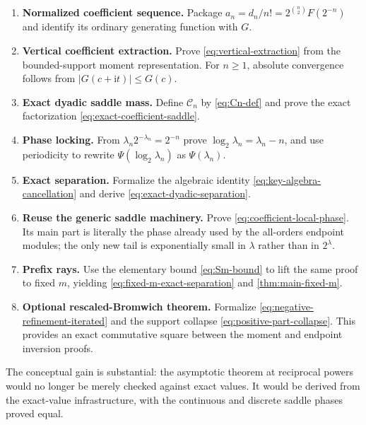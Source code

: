\documentclass[11pt,oneside]{article}
\theoremstyle{definition}
\theoremstyle{remark}
\newcommand{\ii}{\mathrm i}
\newcommand{\CoeffMass}{\mathcal C}
\begin{document}
\begin{enumerate}
\item \textbf{Normalized coefficient sequence.}  Package
$a_n=d_n/n!=2^{\binom n2}F(2^{-n})$ and identify its ordinary generating function with $G$.

\item \textbf{Vertical coefficient extraction.}  Prove
\eqref{eq:vertical-extraction} from the bounded-support moment representation.  For $n\ge1$, absolute convergence follows from
$|G(c+\ii t)|\le G(c)$.

\item \textbf{Exact dyadic saddle mass.}  Define $\CoeffMass_n$ by
\eqref{eq:Cn-def} and prove the exact factorization
\eqref{eq:exact-coefficient-saddle}.

\item \textbf{Phase locking.}  From
$\lambda_n2^{-\lambda_n}=2^{-n}$ prove
$\log_2\lambda_n=\lambda_n-n$, and use periodicity to rewrite
$\Psi(\log_2\lambda_n)$ as $\Psi(\lambda_n)$.

\item \textbf{Exact separation.}  Formalize the algebraic identity
\eqref{eq:key-algebra-cancellation} and derive
\eqref{eq:exact-dyadic-separation}.

\item \textbf{Reuse the generic saddle machinery.}  Prove
\eqref{eq:coefficient-local-phase}.  Its main part is literally the phase already used by the all-orders endpoint modules; the only new tail is exponentially small in $\lambda$ rather than in $2^\lambda$.

\item \textbf{Prefix rays.}  Use the elementary bound
\eqref{eq:Sm-bound} to lift the same proof to fixed $m$, yielding
\eqref{eq:fixed-m-exact-separation} and \cref{thm:main-fixed-m}.

\item \textbf{Optional rescaled-Bromwich theorem.}  Formalize
\eqref{eq:negative-refinement-iterated} and the support collapse
\eqref{eq:positive-part-collapse}.  This provides an exact commutative square between the moment and endpoint inversion proofs.
\end{enumerate}

The conceptual gain is substantial: the asymptotic theorem at reciprocal powers would no longer be merely checked against exact values.  It would be derived from the exact-value infrastructure, with the continuous and discrete saddle phases proved equal.
\end{document}
